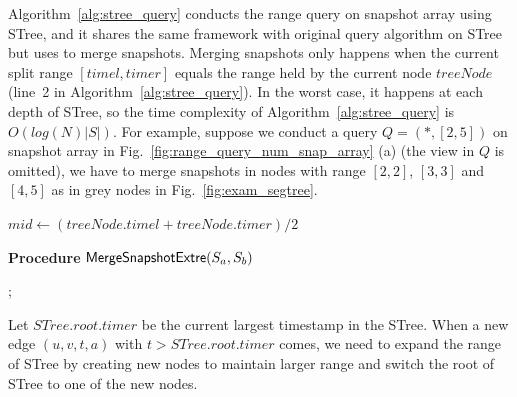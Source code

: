 \documentclass[10pt,journal,compsoc]{IEEEtran}
\begin{document}
 Algorithm~\ref{alg:stree_query} conducts the range query on snapshot array using STree, and it shares the same framework with original query algorithm on STree but uses  to merge snapshots. Merging snapshots only happens when the current split range $ [timel,timer] $ equals the range held by the current node $ treeNode $ (line~2 in Algorithm~\ref{alg:stree_query}). In the worst case, it happens at each depth of STree, so the time complexity of Algorithm~\ref{alg:stree_query} is $ O(log(N)|S|) $. For example, suppose we conduct a query $ Q=(\ast,[2,5]) $ on snapshot array in Fig.~\ref{fig:range_query_num_snap_array} (a) (the view in $ Q $ is omitted), we have to merge snapshots in nodes with range $ [2,2] $, $ [3,3] $ and $ [4,5] $ as in grey nodes in Fig.~\ref{fig:exam_segtree}.
\begin{algorithm}[t]
	\scriptsize
	\caption{$\kw{STreeQuery(treeNode,timel,timer,ans)}$}
	\label{alg:stree_query}
	$ mid \gets (treeNode.timel+treeNode.timer)/2 $\;

\vspace*{0.2cm}
	{\bf Procedure} {${\mathsf{MergeSnapshotExtre}}(S_a,S_b)$}
	
	\Return;
\end{algorithm}

 Let $ STree.root.timer $ be the current largest timestamp in the STree. When a new edge $ (u,v,t,a) $ with $t>STree.root.timer $ comes, we need to expand the range of STree by creating new nodes to maintain larger range and switch the root of STree to one of the new nodes.

\end{document}
